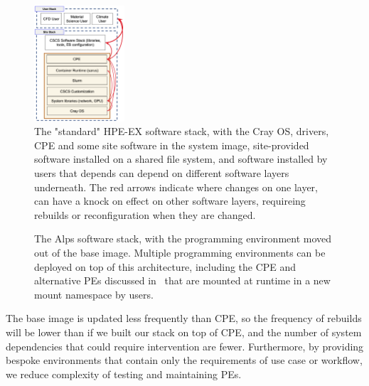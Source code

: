 \begin{figure}[htp!]
    \begin{center}
        \includegraphics[width=0.3\textwidth]{./images/stack-old.png}
    \end{center}
    \caption{
        The "standard" HPE-EX software stack, with the Cray OS, drivers, CPE and some site software in the system image, site-provided software installed on a shared file system, and software installed by users that depends can depend on different software layers underneath.
        The red arrows indicate where changes on one layer, can have a knock on effect on other software layers, requireing rebuilds or reconfiguration when they are changed.
    }
    \label{fig:stack-old}
\end{figure}

\begin{figure}[htp!]
    \begin{center}
    \end{center}
    \caption{
        The Alps software stack, with the programming environment moved out of the base image.
        Multiple programming environments can be deployed on top of this architecture, including the CPE and alternative PEs discussed in~ that are mounted at runtime in a new mount namespace by users.
    }
    \label{fig:stack-old}
\end{figure}

The base image is updated less frequently than CPE, so the frequency of rebuilds will be lower than if we built our stack on top of CPE, and the number of system dependencies that could require intervention are fewer.
Furthermore, by providing bespoke environments that contain only the requirements of use case or workflow, we reduce complexity of testing and maintaining PEs.


